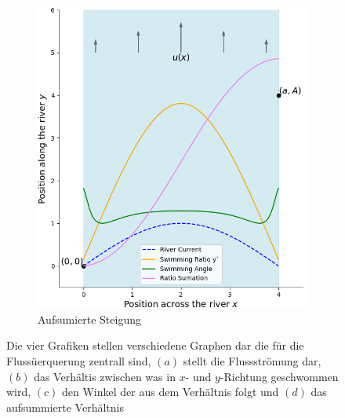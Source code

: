 \begin{figure}
\begin{subfigure}{0.48\textwidth}
        \includegraphics[width=\textwidth]{papers/schwimmen/Grafiken/Figure_5-crop.png}	
        \caption{Aufsumierte Steigung}
        \label{fig:sin_velocity}
    \end{subfigure}
    \par\bigskip
    \caption{Die vier Grafiken stellen verschiedene Graphen dar die für die Flussüerquerung zentrall sind, \((a)\) stellt die Flussströmung dar, \((b)\) das Verhältis zwischen was in \(x\)- und \(y\)-Richtung geschwommen wird, \((c)\) den Winkel der aus dem Verhältnis folgt und \((d)\) das aufsummierte Verhältnis}
    \label{fig:river_pfrofiles}
\end{figure}
